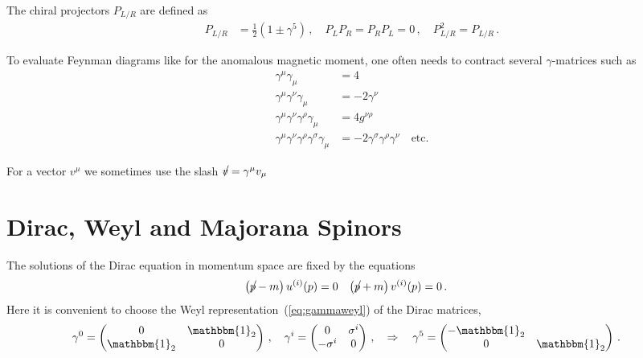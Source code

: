\documentclass[12pt]{report}
\renewcommand{\slash}[2][4]{\ensuremath{\rlap{\raisebox{1pt}{$\mspace{#1mu}/$}}#2}}
\newcommand{\ls}{{\ensuremath{\scriptscriptstyle L}}}
\newcommand{\rs}{{\ensuremath{\scriptscriptstyle R}}}
\newcommand{\2}{\ensuremath{\sqrt{2}\,}}
\begin{document}
{      The chiral projectors $P_{\ls/\rs}$ are defined as
      \begin{align}
        P_{\ls/\rs} &=\frac{1}{2} \left(1\pm \gamma^5 \right)\,,\quad P_\ls P_\rs=P_\rs P_\ls=0\,,\quad
        P_{\ls/\rs}^2=P_{\ls/\rs} \,.
      \end{align}
      
      To evaluate Feynman diagrams like for the anomalous magnetic moment, one often needs to contract
      several $\gamma$-matrices such as
      \begin{subequations}
        \begin{align}
          \gamma^\mu \gamma_\mu &=4\\
          \gamma^\mu \gamma^\nu \gamma_\mu &= -2\gamma^\nu\\
          \gamma^\mu \gamma^\nu \gamma^\rho \gamma_\mu &= 4 g^{\nu\rho}\\
          \gamma^\mu \gamma^\nu \gamma^\rho \gamma^\sigma \gamma_\mu &= -2 \gamma^\sigma \gamma^\rho
          \gamma^\nu \quad \text{etc.}
        \end{align}
      \end{subequations}

      For a vector $v^\mu$ we sometimes use the slash $\slash[2]{v}=\gamma^\mu v_\mu$

    \section{Dirac, Weyl and Majorana Spinors}
      The solutions of the Dirac equation in momentum space are fixed by the equations
      \begin{align}
        \left(\slash[2]{p} -m \right) u^{(i)}(p)&=0 & \left(\slash[2]{p} +m \right) v^{(i)}(p)&=0\,.
      \end{align}
      Here it is convenient to choose the Weyl representation~(\ref{eq:gammaweyl}) of the Dirac
      matrices,
      \begin{align*}
        \gamma^0&=
        \begin{pmatrix}
          0 &\mathbbm{1}_2 \\ \mathbbm{1}_2 &0
        \end{pmatrix}\,,
        \quad \gamma^i=
        \begin{pmatrix}
          0 &\sigma^i\\-\sigma^i &0
        \end{pmatrix}\,,\quad \Rightarrow \quad
        \gamma^5=
        \begin{pmatrix}
          -\mathbbm{1}_2 & \\ 0&\mathbbm{1}_2
        \end{pmatrix}\,.
      \end{align*}
      
}
\end{document}
